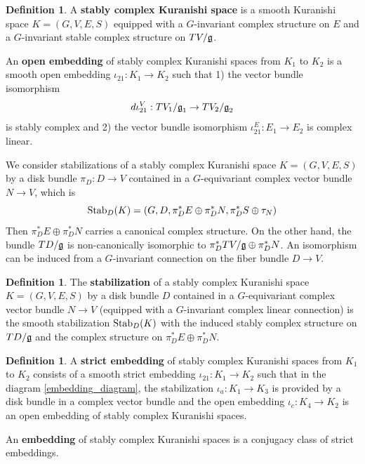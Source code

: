 \documentclass[reqno, 10pt]{amsart}
\numberwithin{equation}{section}
\numberwithin{equation}{section}
\theoremstyle{definition}
\newtheorem{defn}[thm]{Definition}
\theoremstyle{remark}
\newcommand{\beqn}{\begin{equation*}}
\newcommand{\eeqn}{\end{equation*}}
\newcommand{\mf}{\mathfrak}
\newcommand{\uds}[1]{\underline{\smash{#1}}}
\begin{document}
\begin{defn}
A {\bf stably complex Kuranishi space} is a smooth Kuranishi space $K = (G, V, E, S)$ equipped with a $G$-invariant complex structure on $E$ and a $G$-invariant stable complex structure on $TV/\uds{\mf g}$. 

An {\bf open embedding} of stably complex Kuranishi spaces from $K_1$ to $K_2$ is a smooth open embedding $\iota_{21}: K_1 \to K_2$ such that 1) the vector bundle isomorphism 
\beqn
d\iota_{21}^V: TV_1/ \uds{\mf g}_1 \to TV_2/ \uds{\mf g}_2
\eeqn
is stably complex and 2) the vector bundle isomorphism $\iota_{21}^E: E_1 \to E_2$ is complex linear.
\end{defn}


We consider stabilizations of a stably complex Kuranishi space $K = (G, V, E, S)$ by a disk bundle $\pi_D: D \to V$ contained in a $G$-equivariant complex vector bundle $N \to V$, which is 
\beqn
{\rm Stab}_D(K) = (G, D, \pi_D^* E \oplus \pi_D^* N, \pi_D^* S \oplus \tau_N)
\eeqn
Then $\pi_D^* E \oplus \pi_D^* N$ carries a canonical complex structure. On the other hand, the bundle $TD/\uds{\mf g}$ is non-canonically isomorphic to $\pi_D^* TV/\uds{\mf g} \oplus \pi_D^* N$. An isomorphism can be induced from a $G$-invariant connection on the fiber bundle $D \to V$. 


\begin{defn}
The {\bf stabilization} of a stably complex Kuranishi space $K = (G, V, E, S)$ by a disk bundle $D$ contained in a $G$-equivariant complex vector bundle $N \to V$ (equipped with a $G$-invariant complex linear connection) is the smooth stabilization ${\rm Stab}_D(K)$ with the induced stably complex structure on $TD/\uds{\mf g}$ and the complex structure on $\pi_D^* E \oplus \pi_D^* N$.
\end{defn}

\begin{defn}
A {\bf strict embedding} of stably complex Kuranishi spaces from $K_1$ to $K_2$ consists of a smooth strict embedding $\iota_{21}: K_1 \to K_2$ such that in the diagram \eqref{embedding_diagram}, the stabilization $\iota_a: K_1 \to K_3$ is provided by a disk bundle in a complex vector bundle and the open embedding $\iota_c: K_4 \to K_2$ is an open embedding of stably complex Kuranishi spaces.

An {\bf embedding} of stably complex Kuranishi spaces is a conjugacy class of strict embeddings.
\end{defn}
\end{document}
